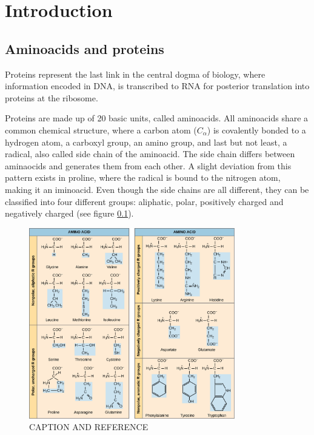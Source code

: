 \documentclass[11pt, a4paper]{report}
\begin{document}
\chapter*{Introduction}
\label{chap:introduction}

\section{Aminoacids and proteins}

Proteins represent the last link in the central dogma of biology, where information encoded in DNA, is transcribed to RNA for posterior translation into proteins at the ribosome.

Proteins are made up of 20 basic units, called aminoacids. All aminoacids share a common chemical structure, where a carbon atom ($C_\alpha$) is covalently bonded to a hydrogen atom, a carboxyl group, an amino group, and last but not least, a radical, also called side chain of the aminoacid. The side chain differs between aminaocids and generates them from each other. A slight deviation from this pattern exists in proline, where the radical is bound to the nitrogen atom, making it an iminoacid. Even though the side chains are all different, they can be classified into four different groups: aliphatic, polar, positively charged and negatively charged (see figure \ref{fig:aminoacids}).

\begin{figure}
  \centering
  \includegraphics[width=0.8\textwidth]{aminoacids2.png}
  \caption{CAPTION AND REFERENCE}
  \label{fig:aminoacids}
\end{figure}
\end{document}
